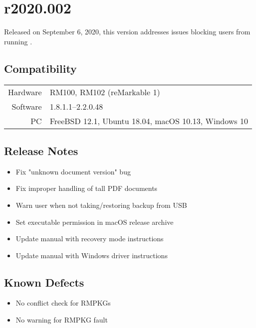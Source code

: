 \newpage
\section{r2020.002}
\label{sec:r2020-002}
Released on September 6, 2020, this version addresses issues blocking users from running .

\subsection{Compatibility}
\begin{tabular}{ r | l }
  Hardware & RM100, RM102 (reMarkable 1) \\
  Software & 1.8.1.1--2.2.0.48 \\
  PC & FreeBSD 12.1, Ubuntu 18.04, macOS 10.13, Windows 10 \\
\end{tabular}

\subsection{Release Notes}
\begin{itemize}
\item{Fix "unknown document version" bug}
\item{Fix improper handling of tall PDF documents}
\item{Warn user when not taking/restoring backup from USB}
\item{Set executable permission in macOS release archive}
\item{Update manual with recovery mode instructions}
\item{Update manual with Windows driver instructions}
\end{itemize}

\subsection{Known Defects}
\begin{itemize}
\item{No conflict check for RMPKGs}
\item{No warning for RMPKG fault}
\end{itemize}









\newpage
